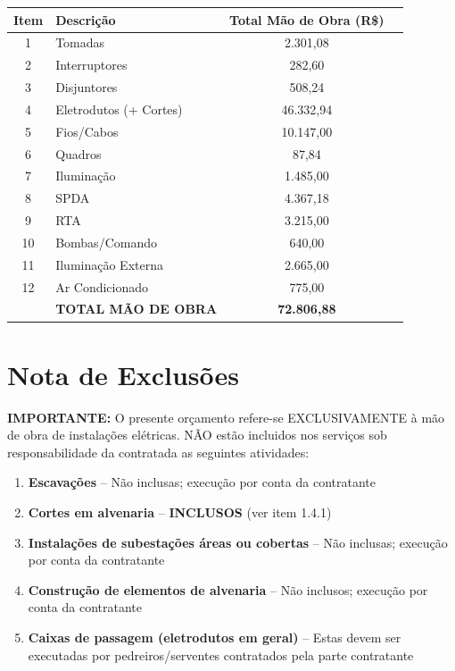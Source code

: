 \documentclass[12pt,a4paper]{article}
\renewenvironment{table}%
{\begin{center}%
\scriptsize%
\addtolength{\tabcolsep}{-2pt}%
}%
{\end{center}}
\begin{document}
\begin{table}
\centering
\begin{tabular}{clcr}
\toprule
\textbf{Item} & \textbf{Descrição} & \textbf{Total Mão de Obra (R\$)} \\
\midrule
1 & Tomadas & 2.301,08 \\
2 & Interruptores & 282,60 \\
3 & Disjuntores & 508,24 \\
4 & Eletrodutos (+ Cortes) & 46.332,94 \\
5 & Fios/Cabos & 10.147,00 \\
6 & Quadros & 87,84 \\
7 & Iluminação & 1.485,00 \\
8 & SPDA & 4.367,18 \\
9 & RTA & 3.215,00 \\
10 & Bombas/Comando & 640,00 \\
11 & Iluminação Externa & 2.665,00 \\
12 & Ar Condicionado & 775,00 \\
\midrule
 & \textbf{TOTAL MÃO DE OBRA} & \textbf{72.806,88} \\
\bottomrule
\end{tabular}
\end{table}

\section{Nota de Exclusões}

\noindent\textbf{IMPORTANTE:} O presente orçamento refere-se EXCLUSIVAMENTE à mão de obra de instalações elétricas. NÃO estão incluidos nos serviços sob responsabilidade da contratada as seguintes atividades:

\begin{enumerate}[noitemsep]
\item \textbf{Escavações} -- Não inclusas; execução por conta da contratante
\item \textbf{Cortes em alvenaria} -- \textbf{INCLUSOS} (ver item 1.4.1)
\item \textbf{Instalações de subestações áreas ou cobertas} -- Não inclusas; execução por conta da contratante
\item \textbf{Construção de elementos de alvenaria} -- Não inclusos; execução por conta da contratante
\item \textbf{Caixas de passagem (eletrodutos em geral)} -- Estas devem ser executadas por pedreiros/serventes contratados pela parte contratante
\end{enumerate}
\end{document}
